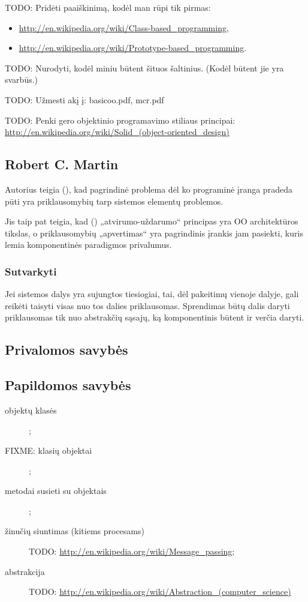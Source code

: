 TODO: Pridėti paaiškinimą, kodėl man rūpi tik pirmas:
\begin{itemize}
  \item \url{http://en.wikipedia.org/wiki/Class-based_programming},
  \item \url{http://en.wikipedia.org/wiki/Prototype-based_programming}.
\end{itemize}

TODO: Nurodyti, kodėl miniu būtent šituos šaltinius. (Kodėl būtent jie
yra svarbūs.)

TODO: Užmesti akį į: basicoo.pdf, mcr.pdf

TODO: Penki gero objektinio programavimo stiliaus principai:
\url{http://en.wikipedia.org/wiki/Solid_(object-oriented_design)}

\subsection{Robert C. Martin}

Autorius teigia (\cite[4]{design-principles-and-design-patterns}), kad
pagrindinė problema dėl ko programinė įranga pradeda pūti yra
priklausomybių tarp sistemos elementų problemos.

Jis taip pat teigia, kad
(\cite[12]{design-principles-and-design-patterns}) „atvirumo-uždarumo“
principas yra OO architektūros tikslas, o priklausomybių
„apvertimas“  yra pagrindinis įrankis jam
pasiekti, kuris lemia komponentinės paradigmos privalumus.

\subsubsection{Sutvarkyti}

Jei sistemos dalys yra sujungtos tiesiogiai, tai, dėl pakeitimų vienoje
dalyje, gali reikėti taisyti visas nuo tos dalies priklausomas. Sprendimas
būtų dalis daryti priklausomas tik nuo abstrakčių sąsajų, ką komponentinis
būtent ir verčia daryti.

\subsection{Privalomos savybės}
\subsection{Papildomos savybės}

\begin{description}
  \item[objektų klasės] ;
  \item[FIXME: klasių objektai] ;
  \item[metodai susieti su objektais] ;
  \item[žinučių siuntimas (kitiems procesams)] 
    TODO: \url{http://en.wikipedia.org/wiki/Message_passing};
  \item[abstrakcija] 
    TODO: \url{http://en.wikipedia.org/wiki/Abstraction_(computer_science)}
\end{description}
